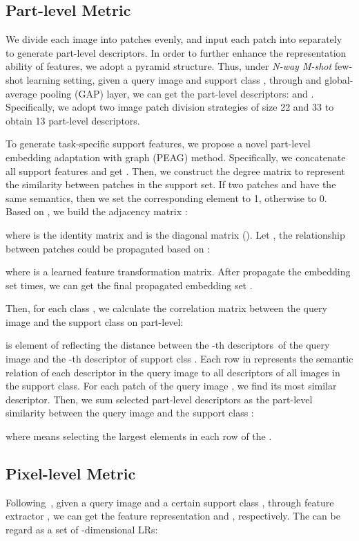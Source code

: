 \documentclass{article}
\begin{document}
\subsection{Part-level Metric}
We divide each image into  patches evenly, and input each patch into  separately to generate part-level descriptors. In order to further enhance the representation ability of features, we adopt a pyramid structure. Thus, under \emph{N-way M-shot} few-shot learning setting, given a query image  and support class , through  and global-average pooling (GAP) layer, we can get the part-level descriptors:
 and . Specifically, we adopt two image patch division strategies of size 22 and 33 to obtain 13 part-level descriptors.  

To generate task-specific support features, we propose a novel part-level embedding adaptation with graph (PEAG) method. Specifically, we concatenate all support features and get . Then, we construct the degree matrix  to represent the similarity between patches in the support set.
If two patches  and  have the same semantics, then we set the corresponding element  to 1, otherwise to 0. Based on , we build the adjacency matrix :

where  is the identity matrix and  is the diagonal matrix (). Let , the relationship between patches could be propagated based on :

where  is a learned feature transformation matrix. After propagate the embedding set  times, we can get the final propagated embedding set .

Then, for each class , we calculate the correlation matrix  between the query image and the support class  on part-level:

 is  element of  reflecting the distance between the -th descriptors\ of the query image and the -th descriptor of support clss . Each row in  represents the semantic relation of each descriptor in the query image to all descriptors of all images in the support class.
For each patch of the query image , we find its most similar descriptor. Then, we sum  selected part-level descriptors as the part-level similarity between the query image and the support class :

where  means selecting the largest elements in each row of the .


\subsection{Pixel-level Metric}
Following~\cite{li2019distribution,li2019revisiting,chen2020multi}, given a query image  and a certain support class , through feature extractor , we can get the feature representation  and , respectively. The  can be regard as a set of  -dimensional LRs:
\end{document}
